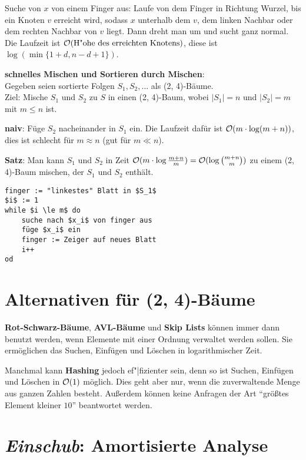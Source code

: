 Suche von $x$ von einem Finger aus:
Laufe von dem Finger in Richtung Wurzel, bis ein Knoten $v$ erreicht wird,
sodass $x$ unterhalb dem $v$, dem linken Nachbar oder dem rechten Nachbar
von $v$ liegt.
Dann dreht man um und sucht ganz normal. \\
Die Laufzeit ist $\mathcal{O}(\text{H"ohe des erreichten Knotens})$,
diese ist $\log(\min\{1 + d, n - d + 1\})$.

\linie

\textbf{schnelles Mischen und Sortieren durch Mischen}: \\
Gegeben seien sortierte Folgen $S_1, S_2, \dotsc$ als (2, 4)-Bäume. \\
Ziel: Mische $S_1$ und $S_2$ zu $S$ in einen (2, 4)-Baum,
wobei $|S_1| = n$ und $|S_2| = m$ mit $m \le n$ ist.

\textbf{naiv}:
Füge $S_2$ nacheinander in $S_1$ ein.
Die Laufzeit dafür ist $\mathcal{O}(m \cdot \log(m + n))$, dies ist schlecht für
$m \approx n$ (gut für $m \ll n$).

\textbf{Satz}:
Man kann $S_1$ und $S_2$ in Zeit
$\mathcal{O}(m \cdot \log \frac{m + n}{m}) = \mathcal{O}(\log \binom{m + n}{m})$ zu einem
(2, 4)-Baum mischen, der $S_1$ und $S_2$ enthält.

\begin{lstlisting}
finger := "linkestes" Blatt in $S_1$
$i$ := 1
while $i \le m$ do
    suche nach $x_i$ von finger aus
    füge $x_i$ ein
    finger := Zeiger auf neues Blatt
    i++
od
\end{lstlisting}

\pagebreak

\section{%
    Alternativen für (2, 4)-Bäume%
}

\textbf{Rot-Schwarz-Bäume}, \textbf{AVL-Bäume} und \textbf{Skip Lists}
können immer dann benutzt werden, wenn Elemente mit einer Ordnung verwaltet
werden sollen.
Sie ermöglichen das Suchen, Einfügen und Löschen in logarithmischer Zeit.

Manchmal kann \textbf{Hashing} jedoch ef"|fizienter sein, denn so ist
Suchen, Einfügen und Löschen in $\mathcal{O}(1)$ möglich.
Dies geht aber nur, wenn die zuverwaltende Menge aus ganzen Zahlen besteht.
Außerdem können keine Anfragen der Art "`größtes Element kleiner $10$"'
beantwortet werden.

\section{%
    \emph{Einschub}: Amortisierte Analyse%
}

